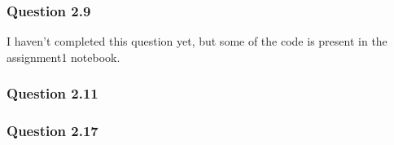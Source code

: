 \documentclass{article}
\begin{document}
\subsubsection{Question 2.9}
{\color{red} I haven't completed this question yet, but some of the code is present in the assignment1 notebook.}
\subsubsection{Question 2.11}
\subsubsection{Question 2.17}
\end{document}
